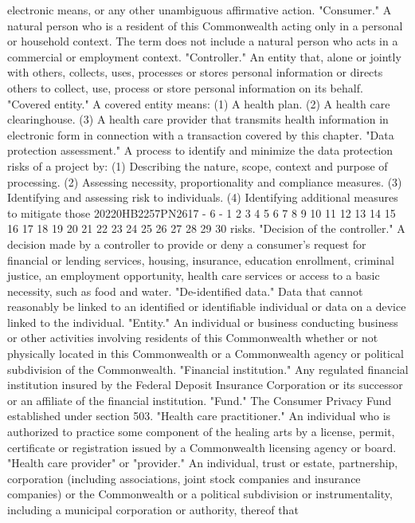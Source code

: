 electronic means, or any other unambiguous affirmative action.
"Consumer." A natural person who is a resident of this
Commonwealth acting only in a personal or household context. The
term does not include a natural person who acts in a commercial
or employment context.
"Controller." An entity that, alone or jointly with others,
collects, uses, processes or stores personal information or
directs others to collect, use, process or store personal
information on its behalf.
"Covered entity." A covered entity means:
(1) A health plan.
(2) A health care clearinghouse.
(3) A health care provider that transmits health
information in electronic form in connection with a
transaction covered by this chapter.
"Data protection assessment." A process to identify and
minimize the data protection risks of a project by:
(1) Describing the nature, scope, context and purpose of
processing.
(2) Assessing necessity, proportionality and compliance
measures.
(3) Identifying and assessing risk to individuals.
(4) Identifying additional measures to mitigate those
20220HB2257PN2617 - 6 -
1
2
3
4
5
6
7
8
9
10
11
12
13
14
15
16
17
18
19
20
21
22
23
24
25
26
27
28
29
30
risks.
"Decision of the controller." A decision made by a
controller to provide or deny a consumer's request for
financial or lending services, housing, insurance, education
enrollment, criminal justice, an employment opportunity, health
care services or access to a basic necessity, such as food and
water.
"De-identified data." Data that cannot reasonably be linked
to an identified or identifiable individual or data on a device
linked to the individual.
"Entity." An individual or business conducting business or
other activities involving residents of this Commonwealth
whether or not physically located in this Commonwealth or a
Commonwealth agency or political subdivision of the
Commonwealth.
"Financial institution." Any regulated financial institution
insured by the Federal Deposit Insurance Corporation or its
successor or an affiliate of the financial institution.
"Fund." The Consumer Privacy Fund established under section
503.
"Health care practitioner." An individual who is authorized
to practice some component of the healing arts by a license,
permit, certificate or registration issued by a Commonwealth
licensing agency or board.
"Health care provider" or "provider." An individual, trust
or estate, partnership, corporation (including associations,
joint stock companies and insurance companies) or the
Commonwealth or a political subdivision or instrumentality,
including a municipal corporation or authority, thereof that
